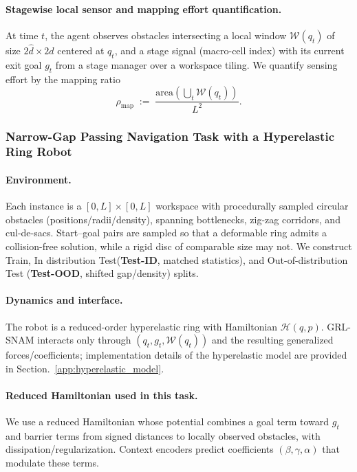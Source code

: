 \documentclass{article} %
\begin{document}
\paragraph{Stagewise local sensor and mapping effort quantification.}
At time $t$, the agent observes obstacles intersecting a local window $\mathcal{W}(q_t)$ of size $2\hat d \times 2\hat d$ centered at $q_t$, and a stage signal (macro-cell index) with its current exit goal $g_t$ from a stage manager over a workspace tiling. We quantify sensing effort by the mapping ratio
\begin{equation}
\rho_{\mathrm{map}} \;:=\; \frac{\mathrm{area}\!\left(\bigcup_t \mathcal{W}(q_t)\right)}{L^2}.
\label{eq:mapping_ratio}
\end{equation}

\subsubsection{ Narrow-Gap Passing Navigation Task with a Hyperelastic Ring Robot}
\label{subsubsec:ring_task}

\paragraph{Environment.}
Each instance is a $[0,L]\times[0,L]$ workspace with procedurally sampled circular obstacles (positions/radii/density), spanning bottlenecks, zig-zag corridors, and cul-de-sacs. Start--goal pairs are sampled so that a deformable ring admits a collision-free solution, while a rigid disc of comparable size may not. We construct Train, {In distribution Test(\textbf{Test-ID}, matched statistics), and Out-of-distribution Test (\textbf{Test-OOD}, shifted gap/density) splits}.

\paragraph{Dynamics and interface.}
The robot is a reduced-order hyperelastic ring with Hamiltonian $\mathcal{H}(q,p)$. GRL-SNAM interacts only through $(q_t, g_t, \mathcal{W}(q_t))$ and the resulting generalized forces/coefficients; implementation details of the hyperelastic model are provided in Section.~\ref{app:hyperelastic_model}.

\paragraph{Reduced Hamiltonian used in this task.}
We use a reduced Hamiltonian whose potential combines a goal term toward $g_t$ and barrier terms from signed distances to locally observed obstacles, with dissipation/regularization. Context encoders predict coefficients $(\beta,\gamma,\alpha)$ that modulate these terms.
\end{document}
